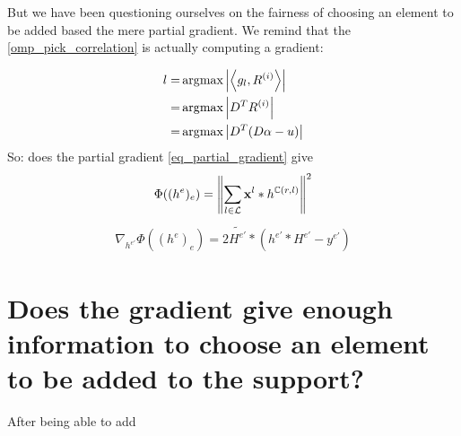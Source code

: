 But we have been questioning ourselves on the fairness of choosing an element to be added based the mere partial gradient. We remind that the \ref{omp_pick_correlation} is actually computing a gradient:

\begin{align*}
l =& \operatorname*{\arg\!\max} \left|\left< g_l,R^{(i)} \right>\right| \\
=& \operatorname*{\arg\!\max} \left| D^TR^{(i)}\right| \\
=& \operatorname*{\arg\!\max} \left| D^T(D\alpha - u)\right| \\
\end{align*}
So: does the partial gradient \ref{eq_partial_gradient} give 
\begin{align*}
\Phi((h^e)_e) = \left\| \sum_{l\in\mathcal L} \mathbf x^l * h^{\mathbb C(r,l)} \right\|^2
\end{align*}
\begin{align*} 
\nabla_{h^{e'}}\Phi((h^e)_e) = 2 \widetilde{H^{e'}} * (h^{e'}*H^{e'}-y^{e'})
\end{align*} \label{eq_partial_gradient}


\section{Does the gradient give enough information to choose an element to be added to the support?}

After being able to add
